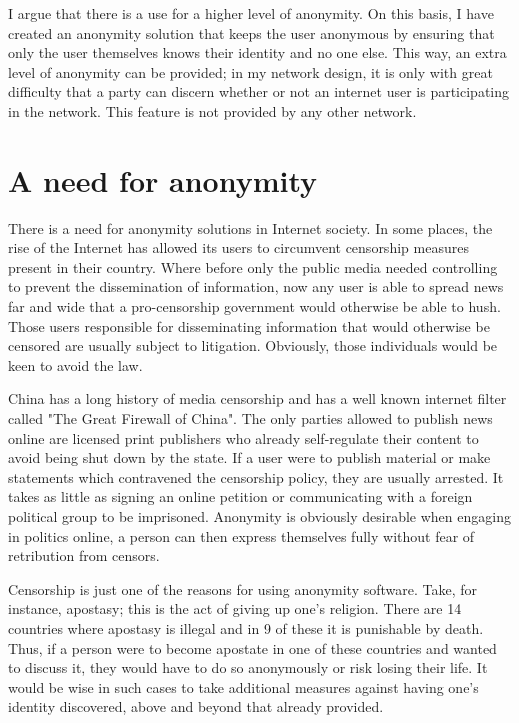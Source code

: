 \documentclass[ %
                    author={Luke Murray},
                supervisor={Dr. Simon Hollis},
                     title={Shadow Peer-to-Peer Networks},
                  subtitle={},
                    degree={MEng},
                      year={2013} ]{thesis}
\begin{document}
I argue that there is a use for a higher level of anonymity. On this basis, I have created an anonymity solution that keeps the user anonymous by ensuring that only the user themselves knows their identity and no one else. This way, an extra level of anonymity can be provided; in my network design, it is only with great difficulty that a party can discern whether or not an internet user is participating in the network. This feature is not provided by any other network.


\section{A need for anonymity}

There is a need for anonymity solutions in Internet society. In some places, the rise of the Internet has allowed its users to circumvent censorship measures present in their country. Where before only the public media needed controlling to prevent the dissemination of information, now any user is able to spread news far and wide that a pro-censorship government would otherwise be able to hush. Those users responsible for disseminating information that would otherwise be censored are usually subject to litigation. Obviously, those individuals would be keen to avoid the law.

China has a long history of media censorship and has a well known internet filter called "The Great Firewall of China". The only parties allowed to publish news online are licensed print publishers who already self-regulate their content to avoid being shut down by the state. If a user were to publish material or make statements which contravened the censorship policy, they are usually arrested. It takes as little as signing an online petition or communicating with a foreign political group to be imprisoned. Anonymity is obviously desirable when engaging in politics online, a person can then express themselves fully without fear of retribution from censors.

Censorship is just one of the reasons for using anonymity software. Take, for instance, apostasy; this is the act of giving up one's religion. There are 14 countries where apostasy is illegal and in 9 of these it is punishable by death. Thus, if a person were to become apostate in one of these countries and wanted to discuss it, they would have to do so anonymously or risk losing their life. It would be wise in such cases to take additional measures against having one's identity discovered, above and beyond that already provided.
\end{document}
